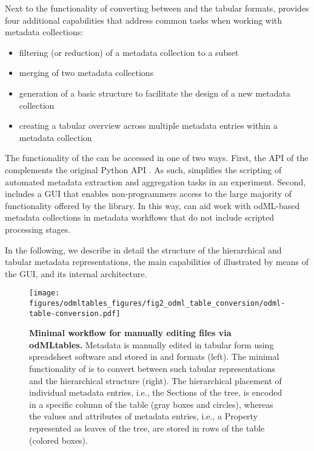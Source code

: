 Next to the functionality of converting between  and the tabular formats,  provides four additional capabilities that address common tasks when working with metadata collections:
\begin{itemize}
    \item filtering (or reduction) of a metadata collection to a subset
    \item merging of two metadata collections
    \item generation of a basic  structure to facilitate the design of a new metadata collection
    \item creating a tabular overview across multiple metadata entries within a metadata collection
\end{itemize}

The functionality of the  can be accessed in one of two ways. First, the API of the  complements the original Python  API \citep{Grewe_2011}. As such,  simplifies the scripting of automated metadata extraction and aggregation tasks in an experiment. Second,  includes a GUI that enables non-programmers access to the large majority of functionality offered by the library. In this way,  can aid work with odML-based metadata collections in metadata workflows that do not include scripted processing stages.

In the following, we describe in detail the structure of the hierarchical and tabular metadata representations, the main capabilities of  illustrated by means of the GUI, and its internal architecture. 


\begin{figure}[!ht]
\begin{center}
\texttt{[image: figures/odmltables\_figures/fig2\_odml\_table\_conversion/odml-table-conversion.pdf]}
\caption[Minimal workflow for manually editing  files via odMLtables]{{\label{fig:min_workflow}
\textbf{Minimal workflow for manually editing  files via odMLtables.} Metadata is manually edited in tabular form using spreadsheet software and stored in  and  formats (left). The minimal functionality of  is to convert between such tabular representations and the hierarchical  structure (right). The hierarchical placement of individual metadata entries, i.e., the Sections of the  tree, is encoded in a specific column of the table (gray boxes and circles), whereas the values and attributes of metadata entries, i.e., a Property represented as leaves of the  tree, are stored in rows of the table (colored boxes).%
}}
\end{center}
\end{figure}

